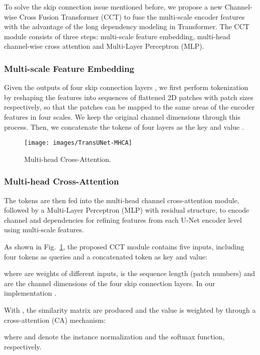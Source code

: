 \documentclass[letterpaper]{article} \usepackage{aaai22}  \usepackage{times}  \usepackage{helvet}  \usepackage{courier}  \usepackage[hyphens]{url}  \usepackage{graphicx} \urlstyle{rm} \def\UrlFont{\rm}  \usepackage{natbib}  \usepackage{caption} \DeclareCaptionStyle{ruled}{labelfont=normalfont,labelsep=colon,strut=off} \frenchspacing  \setlength{\pdfpagewidth}{8.5in}  \setlength{\pdfpageheight}{11in}  \usepackage{algorithm}
\begin{document}
	
	
	To solve the skip connection issue mentioned before, we propose a new Channel-wise Cross Fusion Transformer (CCT) to fuse the  multi-scale encoder features with the advantage of the long dependency modeling in Transformer.
The CCT module consists of three steps: multi-scale feature embedding, multi-head channel-wise cross attention and Multi-Layer Perceptron (MLP).  
	
	\subsubsection{Multi-scale Feature Embedding}
	Given the outputs of four skip connection layers , we first perform tokenization by reshaping the features into sequences of flattened 2D patches with patch sizes  respectively, so that the patches can be mapped to the same areas of the encoder features in four scales. We keep the original channel dimensions through this process.
	Then, we concatenate the tokens of four layers  as the key and value .
	
	
	\begin{figure}[t]
		\centering
		\texttt{[image: images/TransUNet-MHCA]} \caption{Multi-head Cross-Attention.}
		\label{MHCA}
	\end{figure}
	
	
	\subsubsection{Multi-head Cross-Attention}
	
	The tokens are then fed into the multi-head channel cross-attention module, followed by a Multi-Layer Perceptron (MLP) with residual structure, to encode channel and dependencies for refining features from each U-Net encoder level using multi-scale features.  
	
	As shown in Fig.~\ref{MHCA}, the proposed CCT module contains five inputs, including four tokens  as queries and a concatenated token  as key and value:
	
	where  are weights of different inputs,  is the sequence length (patch numbers) and  are the channel dimensions of the four skip connection layers. In our implementation .
	
	
	With , the similarity matrix  are produced and the value  is weighted by  through a cross-attention (CA) mechanism:
	
	where  and   denote the instance normalization\cite{InstanceNormalizationMissing_2017} and the softmax function, respectively.
	
\end{document}
